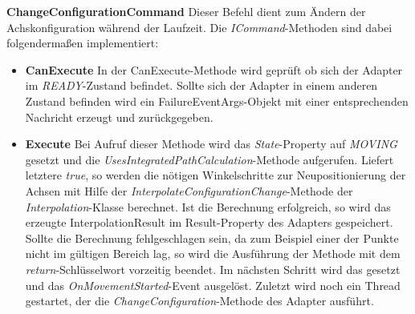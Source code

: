 \textbf{ChangeConfigurationCommand}
\newline
Dieser Befehl dient zum Ändern der Achskonfiguration während der Laufzeit. Die \textit{ICommand}-Methoden sind dabei folgendermaßen implementiert:
\begin{itemize}
\item \textbf{CanExecute}
\newline
In der CanExecute-Methode wird geprüft ob sich der Adapter im \textit{READY}-Zustand befindet. Sollte sich der Adapter in einem anderen Zustand befinden wird ein FailureEventArgs-Objekt mit einer entsprechenden Nachricht erzeugt und zurückgegeben.
\item \textbf{Execute}
\newline
Bei Aufruf dieser Methode wird das \textit{State}-Property auf \textit{MOVING} gesetzt  und die \textit{UsesIntegratedPathCalculation}-Methode aufgerufen. Liefert letztere \textit{true}, so werden die nötigen Winkelschritte zur Neupositionierung der Achsen mit Hilfe der \textit{InterpolateConfigurationChange}-Methode der \textit{Interpolation}-Klasse berechnet. Ist die Berechnung erfolgreich, so wird das erzeugte InterpolationResult im Result-Property des Adapters gespeichert. Sollte die Berechnung fehlgeschlagen sein, da zum Beispiel einer der Punkte nicht im gültigen Bereich lag, so wird die Ausführung der Methode mit dem \textit{return}-Schlüsselwort vorzeitig beendet. Im nächsten Schritt wird das  gesetzt und das \textit{OnMovementStarted}-Event ausgelöst. Zuletzt wird noch ein Thread gestartet, der die \textit{ChangeConfiguration}-Methode des Adapter ausführt.
\end{itemize}

